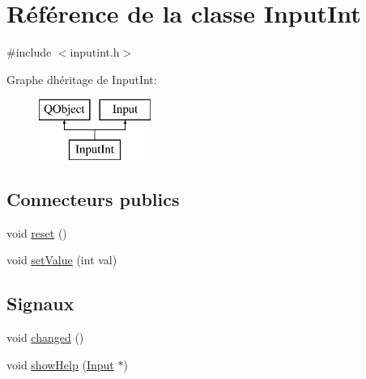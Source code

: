 \hypertarget{class_input_int}{}\section{Référence de la classe Input\+Int}
\label{class_input_int}


{\ttfamily \#include $<$inputint.\+h$>$}

Graphe d\textquotesingle{}héritage de Input\+Int\+:\begin{figure}[H]
\begin{center}
\leavevmode
\includegraphics[height=2.000000cm]{class_input_int}
\end{center}
\end{figure}
\subsection*{Connecteurs publics}
\begin{DoxyCompactItemize}
\item 
void \hyperlink{class_input_int_aadc0ea3998b1a2999ebba00e8dd22dec}{reset} ()
\item 
void \hyperlink{class_input_int_a4386dcb463dfa2448ff149151e28c1cf}{set\+Value} (int val)
\end{DoxyCompactItemize}
\subsection*{Signaux}
\begin{DoxyCompactItemize}
\item 
void \hyperlink{class_input_int_ae0b93d9ff0feab6c44e57f663e87761d}{changed} ()
\item 
void \hyperlink{class_input_int_a54353b10d51efea62d61261582f49d35}{show\+Help} (\hyperlink{class_input}{Input} $\ast$)
\end{DoxyCompactItemize}
